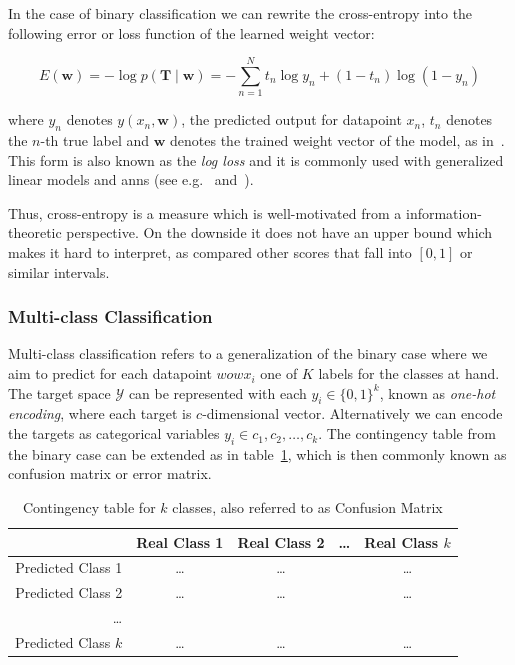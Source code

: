 In the case of binary classification we can rewrite the cross-entropy into the following error or loss function of the learned weight vector:

\begin{equation}
  E(\mathbf{w}) =  -\log p(\mathbf{T} \mid \mathbf{w}) = - \sum_{n=1}^N {t_n \log y_n + (1 - t_n) \log (1 - y_n)}
\end{equation}

where $y_n$ denotes $y(x_n, \mathbf{w})$, the predicted output for datapoint $x_n$, $t_n$ denotes the $n$-th true label and $\mathbf{w}$ denotes the trained weight vector of the model, as in~\cite[Chapter 4.3.2, p.~205 ]{Bishop:2006aa}. This form is also known as the \emph{log loss} and it is commonly used with generalized linear models and \glspl{ann} (see e.g.~\cite[Chapter 4.3.2, p.~205 ]{Bishop:2006aa} and~\cite[Chapter 10.7, p.~251 ]{Alpaydin:2014aa}).

Thus, cross-entropy is a measure which is well-motivated from a information-theoretic perspective. On the downside it does not have an upper bound which makes it hard to interpret, as compared other scores that fall into $[0, 1]$ or similar intervals.

\subsubsection{Multi-class Classification}
\label{subs:Multi-class Classification}

Multi-class classification refers to a generalization of the binary case where we aim to predict for each datapoint $wowx_i$ one of $K$ labels for the classes at hand. The target space $\mathcal{Y}$ can be represented with each $y_i \in \{ 0,1 \}^k$, known as \emph{one-hot encoding}, where each target is $c$-dimensional vector. Alternatively we can encode the targets as categorical variables $y_i \in {c_1, c_2, \ldots, c_k}$. The contingency table from the binary case can be extended as in table~\ref{table:contingency-table-k}, which is then commonly known as
\gls{confusion matrix} or \gls{error matrix}.

\begin{center}
  \begin{table}[h]
  \begin{tabular}{r | c c c c }
    & Real Class 1 & Real Class 2 & \ldots & Real Class $k$ \\
    \hline
    Predicted Class 1    & \ldots & \ldots & & \ldots \\
    Predicted Class 2    & \ldots & \ldots & & \ldots \\
    \ldots               & & & & \\
    Predicted Class $k$  & \ldots & \ldots & & \ldots \\
  \end{tabular}
  \caption{Contingency table for $k$ classes, also referred to as Confusion Matrix}
\label{table:contingency-table-k}
\end{table}
\end{center}

